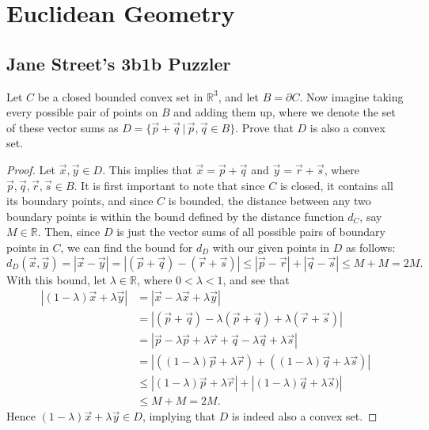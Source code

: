 \documentclass[11pt]{article}
\begin{document}
\pagestyle{fancy}
\fancyhead{}
\tableofcontents
\newpage
\section{Euclidean Geometry}
\subsection{Jane Street's 3b1b Puzzler}
Let $C$ be a closed bounded convex set in $\mathbb{R}^3$, and let $B = \partial C$.
Now imagine taking every possible pair of points on $B$ and adding them up,
where we denote the set of these vector sums as $D = \{\vec{p}+\vec{q} \, | \,\vec{p},\vec{q} \in B\}$.
Prove that $D$ is also a convex set.
\begin{proof}
Let $\vec{x},\vec{y} \in D$. This implies that $\vec{x} = \vec{p} + \vec{q}$ and $\vec{y} = \vec{r} + \vec{s}$,
where $\vec{p},\vec{q},\vec{r},\vec{s} \in B$. It is first important to note that since $C$ is closed, it contains all its boundary points,
and since $C$ is bounded, the distance between any two boundary points is within the bound
defined by the distance function $d_C$, say $M \in \mathbb{R}$. Then, since $D$ is just the vector sums of all possible pairs of boundary points in $C$,
we can find the bound for $d_D$ with our given points in $D$ as follows:
\begin{equation*}
d_D(\vec{x},\vec{y}) = |\vec{x} - \vec{y}| = |(\vec{p} + \vec{q}) - (\vec{r} + \vec{s})| \leq |\vec{p} - \vec{r}| + |\vec{q} - \vec{s}| \leq M + M = 2M.
\end{equation*}
With this bound, let $\lambda \in \mathbb{R}$, where $0 < \lambda < 1$, and see that
\begin{align*}
|(1-\lambda)\vec{x} + \lambda\vec{y}| &= |\vec{x} - \lambda\vec{x} + \lambda\vec{y}| \\
                                      &= |(\vec{p}+\vec{q}) - \lambda(\vec{p}+\vec{q}) + \lambda(\vec{r} + \vec{s})| \\
                                      &= |\vec{p} - \lambda\vec{p} + \lambda\vec{r} + \vec{q} - \lambda\vec{q} + \lambda\vec{s}| \\
                                      &= |((1-\lambda)\vec{p} + \lambda\vec{r}) + ((1-\lambda)\vec{q} + \lambda\vec{s})| \\
                                      & \leq |(1-\lambda)\vec{p} + \lambda\vec{r}| + |(1-\lambda)\vec{q} + \lambda\vec{s})| \\
                                      & \leq M + M = 2M.
\end{align*}
Hence $(1-\lambda)\vec{x} + \lambda\vec{y} \in D$, implying that $D$ is indeed also a convex set.
\end{proof}
\end{document}

